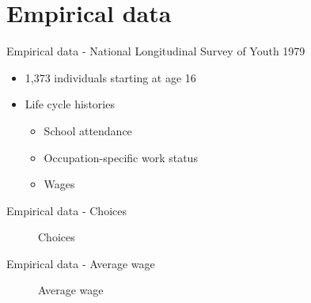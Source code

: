 \section{Empirical data}
\begin{frame}{Empirical data - National Longitudinal Survey of Youth 1979}

\begin{itemize}\setlength\itemsep{1em}
\item 1,373 individuals starting at age 16
\item Life cycle histories \medskip
\begin{itemize}\setlength\itemsep{1em}
\item School attendance
\item Occupation-specific work status
\item Wages
\end{itemize}
\end{itemize}
\end{frame}
\begin{frame}{Empirical data - Choices}
  \begin{figure}
  \caption{Choices}
  \end{figure}
\end{frame}

\begin{frame}{Empirical data - Average wage}
  \begin{figure}
  \caption{Average wage}
  \end{figure}
\end{frame}
